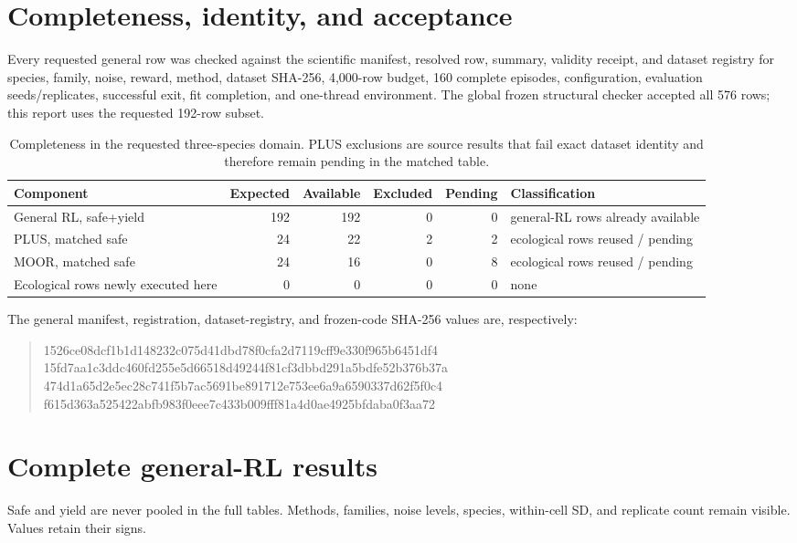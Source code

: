 \documentclass[10pt]{article}
\begin{document}
\section{Completeness, identity, and acceptance}
Every requested general row was checked against the scientific manifest, resolved row, summary,
validity receipt, and dataset registry for species, family, noise, reward, method, dataset SHA-256,
4,000-row budget, 160 complete episodes, configuration, evaluation seeds/replicates, successful exit,
fit completion, and one-thread environment. The global frozen structural checker accepted all
576 rows; this report uses the requested 192-row subset.

\begin{table}[ht]
\centering
\footnotesize
\begin{tabular}{@{}p{3.8cm}rrrrp{4.3cm}@{}}
\toprule
Component & Expected & Available & Excluded & Pending & Classification\\
\midrule
General RL, safe+yield & 192 & 192 & 0 & 0 & general-RL rows already available\\
PLUS, matched safe & 24 & 22 & 2 & 2 & ecological rows reused / pending\\
MOOR, matched safe & 24 & 16 & 0 & 8 & ecological rows reused / pending\\
Ecological rows newly executed here & 0 & 0 & 0 & 0 & none\\
\bottomrule
\end{tabular}
\caption{Completeness in the requested three-species domain. PLUS exclusions are source results
that fail exact dataset identity and therefore remain pending in the matched table.}
\end{table}

The general manifest, registration, dataset-registry, and frozen-code SHA-256 values are,
respectively:
\begin{quote}\ttfamily\small
1526ce08dcf1b1d148232c075d41dbd78f0cfa2d7119cff9e330f965b6451df4\\
15fd7aa1c3ddc460fd255e5d66518d49244f81cf3dbbd291a5bdfe52b376b37a\\
474d1a65d2e5ec28c741f5b7ac5691be891712e753ee6a9a6590337d62f5f0c4\\
f615d363a525422abfb983f0eee7c433b009fff81a4d0ae4925bfdaba0f3aa72
\end{quote}

\section{Complete general-RL results}
Safe and yield are never pooled in the full tables. Methods, families, noise levels, species,
within-cell SD, and replicate count remain visible. Values retain their signs.
\end{document}
